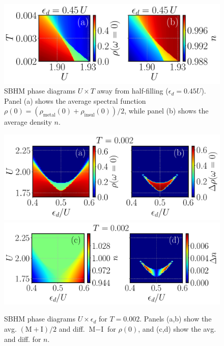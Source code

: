 \documentclass[portrait]{a0poster}
\begin{document}
\begin{paracol}{2}
\switchcolumn
\vspace{-0.0em}

\begin{figure}[H]
\includegraphics[width=\columnwidth]{Figs/fig3-045-eps-converted-to.pdf}
\vspace{-2em}
\caption{SBHM phase diagrams $U \times T$ away from half-filling ($\epsilon_d=0.45U$). Panel (a) shows the average spectral function $\rho(0) = (\rho_{\text{metal}}(0) + \rho_{\text{insul}}(0)) / 2$, while panel (b) shows the average density $n$.}
\label{fig:Diagram_UxT_ed045}
\end{figure}

\vspace{-1.5em}
\begin{figure}[H]
\centering
\includegraphics[width=\columnwidth]{Figs/fig4-ab-eps-converted-to.pdf}
\includegraphics[width=\columnwidth]{Figs/fig5-ab-eps-converted-to.pdf}
\vspace{-1.5em}
\caption{SBHM phase diagrams $U \times \epsilon_d$ for $T=0.002$. Panels (a,b) show the avg. $(\text{M}+\text{I})/2$ and diff. $\text{M}-\text{I}$ for $\rho(0)$, and (c,d) show the avg. and diff. for $n$. }
\label{fig:Diagram_Drho_U_ed_T0002_T0004}
\end{figure}


\end{paracol}
\end{document}
